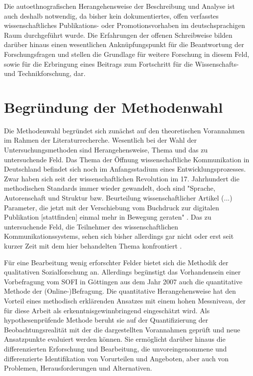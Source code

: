 Die autoethnografischen Herangehensweise der Beschreibung und Analyse ist auch deshalb notwendig, da bisher kein dokumentiertes, offen verfasstes wissenschaftliches Publikations- oder Promotionsvorhaben im deutschsprachigen Raum durchgeführt wurde. Die Erfahrungen der offenen Schreibweise bilden darüber hinaus einen wesentlichen Anknüpfungspunkt für die Beantwortung der Forschungsfragen und stellen die Grundlage für weitere Forschung in diesem Feld, sowie für die Erbringung eines Beitrags zum Fortschritt für die Wissenschafts- und Technikforschung, dar.

\section{Begründung der Methodenwahl}

Die Methodenwahl begründet sich zunächst auf den theoretischen Vorannahmen im Rahmen der Literaturrecherche. Wesentlich bei der Wahl der Untersuchungsmethoden sind Herangehensweise, Thema und das zu untersuchende Feld. Das Thema der Öffnung wissenschaftliche Kommunikation in Deutschland befindet sich noch im Anfangsstadium eines Entwicklungsprozesses. Zwar haben sich seit der wissenschaftlichen Revolution im 17. Jahrhundert die methodischen Standards immer wieder gewandelt, doch sind "Sprache, Autorenschaft und Struktur bzw. Beurteilung wissenschaftlicher Artikel (...) Parameter, die jetzt mit der Verschiebung vom Buchdruck zur digitalen Publikation [stattfinden] einmal mehr in Bewegung geraten" \cite{hagner_2015_sache_buches}. Das zu untersuchende Feld, die Teilnehmer des wissenschaftlichen Kommunikationssystems, sehen sich bisher allerdings gar nicht oder erst seit kurzer Zeit mit dem hier behandelten Thema konfrontiert \cite{hagner_2015_sache_buches}.

Für eine Bearbeitung wenig erforschter Felder bietet sich die Methodik der qualitativen Sozialforschung an. Allerdings begünstigt das Vorhandensein einer Vorbefragung vom SOFI in Göttingen aus dem Jahr 2007 auch die quantitative Methode der (Online-)Befragung. Die quantitative Herangehensweise hat den Vorteil eines methodisch erklärenden Ansatzes mit einem hohen Messniveau, der für diese Arbeit als erkenntnisgewinnbringend eingeschätzt wird. Als hypothesenprüfende Methode beruht sie auf der Quantifizierung der Beobachtungsrealität \cite{bortz_Doering_2006_Methoden} mit der die dargestellten Vorannahmen geprüft und neue Ansatzpunkte evaluiert werden können. Sie ermöglicht darüber hinaus die differenzierten Erforschung und Bearbeitung, die unvoreingenommene und differenzierte Identifikation von Vorurteilen und Angeboten, aber auch von Problemen, Herausforderungen und Alternativen.

